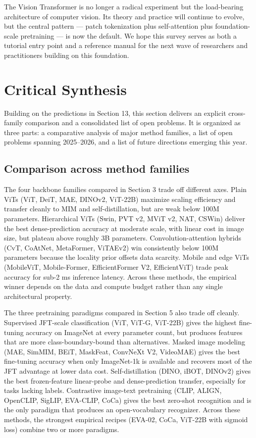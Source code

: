 The Vision Transformer is no longer a radical experiment but the load-bearing architecture of computer vision. Its theory and practice will continue to evolve, but the central pattern --- patch tokenization plus self-attention plus foundation-scale pretraining --- is now the default. We hope this survey serves as both a tutorial entry point and a reference manual for the next wave of researchers and practitioners building on this foundation.

\section{Critical Synthesis}\label{critical-synthesis}

Building on the predictions in Section 13, this section delivers an explicit cross-family comparison and a consolidated list of open problems. It is organized as three parts: a comparative analysis of major method families, a list of open problems spanning 2025--2026, and a list of future directions emerging this year.

\subsection{Comparison across method families}\label{comparison-across-method-families}

The four backbone families compared in Section 3 trade off different axes. Plain ViTs (ViT, DeiT, MAE, DINOv2, ViT-22B) maximize scaling efficiency and transfer cleanly to MIM and self-distillation, but are weak below 100M parameters. Hierarchical ViTs (Swin, PVT v2, MViT v2, NAT, CSWin) deliver the best dense-prediction accuracy at moderate scale, with linear cost in image size, but plateau above roughly 3B parameters. Convolution-attention hybrids (CvT, CoAtNet, MetaFormer, ViTAEv2) win consistently below 100M parameters because the locality prior offsets data scarcity. Mobile and edge ViTs (MobileViT, Mobile-Former, EfficientFormer V2, EfficientViT) trade peak accuracy for sub-2 ms inference latency. Across these methods, the empirical winner depends on the data and compute budget rather than any single architectural property.

The three pretraining paradigms compared in Section 5 also trade off cleanly. Supervised JFT-scale classification (ViT, ViT-G, ViT-22B) gives the highest fine-tuning accuracy on ImageNet at every parameter count, but produces features that are more class-boundary-bound than alternatives. Masked image modeling (MAE, SimMIM, BEiT, MaskFeat, ConvNeXt V2, VideoMAE) gives the best fine-tuning accuracy when only ImageNet-1k is available and recovers most of the JFT advantage at lower data cost. Self-distillation (DINO, iBOT, DINOv2) gives the best frozen-feature linear-probe and dense-prediction transfer, especially for tasks lacking labels. Contrastive image-text pretraining (CLIP, ALIGN, OpenCLIP, SigLIP, EVA-CLIP, CoCa) gives the best zero-shot recognition and is the only paradigm that produces an open-vocabulary recognizer. Across these methods, the strongest empirical recipes (EVA-02, CoCa, ViT-22B with sigmoid loss) combine two or more paradigms.

